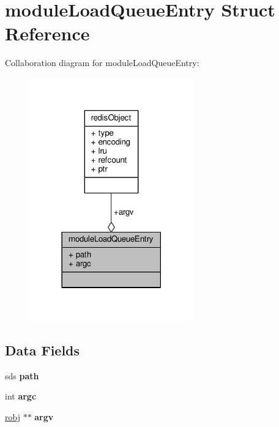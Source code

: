 \hypertarget{structmoduleLoadQueueEntry}{}\section{module\+Load\+Queue\+Entry Struct Reference}
\label{structmoduleLoadQueueEntry}


Collaboration diagram for module\+Load\+Queue\+Entry\+:\nopagebreak
\begin{figure}[H]
\begin{center}
\leavevmode
\includegraphics[width=201pt]{structmoduleLoadQueueEntry__coll__graph}
\end{center}
\end{figure}
\subsection*{Data Fields}
\begin{DoxyCompactItemize}
\item 
\mbox{\label{structmoduleLoadQueueEntry_a066b343dd79be3ae82b3c47d8a634ec8}} 
sds {\bfseries path}
\item 
\mbox{\label{structmoduleLoadQueueEntry_a2dc0861954e6b66f6686ec821ffdd9e0}} 
int {\bfseries argc}
\item 
\mbox{\label{structmoduleLoadQueueEntry_a5aa2d49960e9d8e8836f6290f2070290}} 
\hyperlink{structredisObject}{robj} $\ast$$\ast$ {\bfseries argv}
\end{DoxyCompactItemize}


